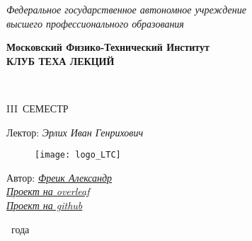 \newcommand{\FullCourseNameFirstPart}{\so{ТЕОРИЯ~МЕРЫ}}
\newcommand{\FullCourseNameSecondPart}{\so{}}
\newcommand{\SemesterNumber}{III}
\newcommand{\LecturerInitials}{Эрлих Иван Генрихович}
\newcommand{\AutherInitials}{Фреик Александр}
\newcommand{\VKLink}{https://vk.com/akira33333}
\newcommand{\OverleafLink}{https://www.overleaf.com/read/vjgrqfzydcyq}
\newcommand{\GithubLink}{https://github.com/MIPT-Group/Lectures_Tex_Club/tree/master/lectures/Lecture_Tex_Example}

\begin{titlepage}
	\clearpage\thispagestyle{empty}
	\centering
	
	\textit{Федеральное государственное автономное учреждение \\
		высшего профессионального образования}
	\vspace{0.5ex}
	
	\textbf{Московский Физико-Технический Институт \\ КЛУБ ТЕХА ЛЕКЦИЙ}
	\vspace{20ex}
	\vspace{13ex}
	
	{\textbf{\FullCourseNameFirstPart}}
	\\
	{\textbf{\FullCourseNameSecondPart}}
	
	\SemesterNumber\ СЕМЕСТР  
	\vspace{1ex}
	
	Лектор: \textit{\LecturerInitials}
	
	\begin{figure}[!ht]
		\centering
		\texttt{[image: logo\_LTC]}
		\label{fig:my_label}
	\end{figure}
\begin{flushright}
	\noindent
	Автор: \href{\VKLink}{\textit{\AutherInitials}}
	\\
	\href{\OverleafLink}{\textit{Проект на overleaf}}
	\\
	\href{\GithubLink}{\textit{Проект на github}} %
\end{flushright}
	
	\vfill
	\CourseDate\ года
	\pagebreak
	
\end{titlepage}
